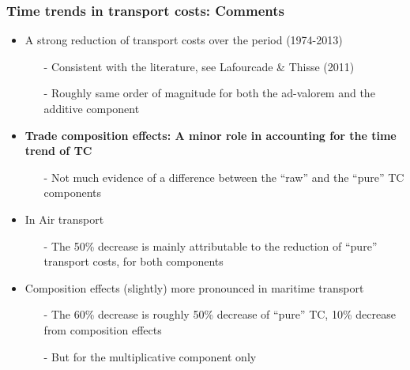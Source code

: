 \documentclass[10 pt,Helvetica, french]{beamer}
\begin{document}
\begin{frame}
\frametitle{Time trends in transport costs: Comments}
\begin{itemize}
\item A strong reduction of transport costs over the period (1974-2013) \vspace{0.1cm}
\begin{itemize}
\footnotesize
\item[-] Consistent with the literature, see Lafourcade \& Thisse (2011) \vspace{0.1cm}
\item[-] Roughly same order of magnitude for both the ad-valorem and the additive component  \vspace{0.1cm}
\normalsize
\end{itemize}
\item \textbf{Trade composition effects: A minor role in accounting for the time trend of TC}\vspace{0.1cm}
\begin{itemize}
\footnotesize
\item[-] Not much evidence of a difference between the ``raw'' and the ``pure'' TC components \vspace{0.1cm}
\normalsize
\end{itemize}
\item In Air transport \vspace{0.1cm}
\begin{itemize}
\footnotesize
\item[-] The 50\% decrease is mainly attributable to the reduction of ``pure'' transport costs, for both components  \vspace{0.1cm}
\end{itemize}
\normalsize
\item Composition effects (slightly) more pronounced in maritime transport \vspace{0.1cm}
\begin{itemize}
\footnotesize
\item[-] The 60\% decrease is roughly 50\% decrease of ``pure'' TC, 10\% decrease from composition effects \vspace{0.1cm}
\item[-] But for the multiplicative component only \vspace{0.1cm}
\end{itemize}
\normalsize
\end{itemize}
\end{frame}
\end{document}
